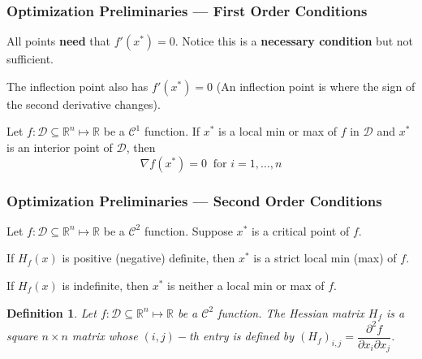\documentclass[11pt,xcolor={svgnames},aspectratio=169,usepdftitle=false]{beamer}
\let\toneitemize\itemize
\let\ttwoitemize\enditemize
\renewenvironment{itemize}{\toneitemize\addtolength{\itemsep}{0.7\baselineskip}}{\ttwoitemize}
\let\toneenumer\enumerate
\let\ttwoenumer\endenumerate
\renewenvironment{enumerate}{\toneenumer\addtolength{\itemsep}{0.7\baselineskip}}{\ttwoenumer}
\newtheorem{definition}{Definition}
\begin{document}
\begin{frame}
  \frametitle{Optimization Preliminaries --- First Order Conditions}
\begin{itemize}
  \item All points \alert{\textbf{need}} that $f'(x^*) = 0$. Notice this is a \alert{\textbf{necessary condition}} but not sufficient.
  \item The inflection point also has $f'(x^*) = 0$ {\tiny (An inflection point is where the sign of the second derivative changes)}.
\end{itemize}

\begin{theorem}
Let $f : \mathcal{D}\subseteq\mathbb{R}^n \mapsto \mathbb{R}$ be a $\mathcal{C}^1$ function. If $x^*$ is a local min or max of $f$ in $\mathcal{D}$ and $x^*$ is an interior point of $\mathcal{D}$, then
\[
\nabla f(x^*) = 0 \ \text{ for } i = 1,\ldots, n
\]
\end{theorem}
\end{frame}

\begin{frame}
  \frametitle{Optimization Preliminaries --- Second Order Conditions}
\begin{theorem}
Let $f : \mathcal{D}\subseteq\mathbb{R}^n \mapsto \mathbb{R}$ be a $\mathcal{C}^2$ function. Suppose $x^*$ is a critical point of $f$.
\begin{enumerate}
  \item If $H_f(x)$ is positive (negative) definite, then $x^*$ is a strict local min (max) of $f$.
  \item If $H_f(x)$ is indefinite, then $x^*$ is neither a local min or max of $f$.
\end{enumerate}
\end{theorem}

\begin{definition}
Let $f : \mathcal{D}\subseteq\mathbb{R}^n \mapsto \mathbb{R}$ be a $\mathcal{C}^2$ function. The Hessian matrix $H_f$ is a square $n\times n$ matrix whose $(i,j)-$th entry is defined by $(H_f)_{i,j} = \dfrac{\partial^2 f}{\partial x_i \partial x_j}$.
\end{definition}
\end{frame}
\end{document}
